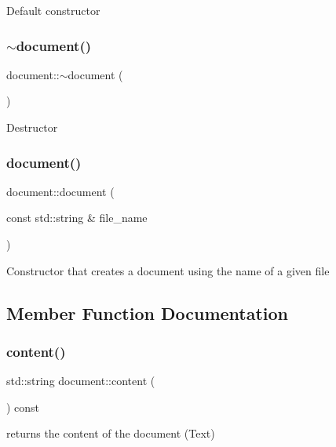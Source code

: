 Default constructor \mbox{\label{classdocument_afff6a78ede7767d8cbc0cb4566ae64da}} 
\subsubsection{\texorpdfstring{$\sim$document()}{~document()}}
{\footnotesize\ttfamily document\+::$\sim$document (\begin{DoxyParamCaption}{ }\end{DoxyParamCaption})}

Destructor \mbox{\label{classdocument_a750ac91b3537c59d0fff8e4a01085c98}} 
\subsubsection{\texorpdfstring{document()}{document()}\hspace{0.1cm}{\footnotesize\ttfamily [2/2]}}
{\footnotesize\ttfamily document\+::document (\begin{DoxyParamCaption}\item[{const std\+::string \&}]{file\+\_\+name }\end{DoxyParamCaption})}

Constructor that creates a document using the name of a given file 

\subsection{Member Function Documentation}
\mbox{\label{classdocument_a1f8943b94ad98c7b7c4b6fbec6370f66}} 
\subsubsection{\texorpdfstring{content()}{content()}}
{\footnotesize\ttfamily std\+::string document\+::content (\begin{DoxyParamCaption}{ }\end{DoxyParamCaption}) const}

returns the content of the document (Text) \mbox{\label{classdocument_adb574ffbe92dcb3b2ba2eb134257a091}} 
